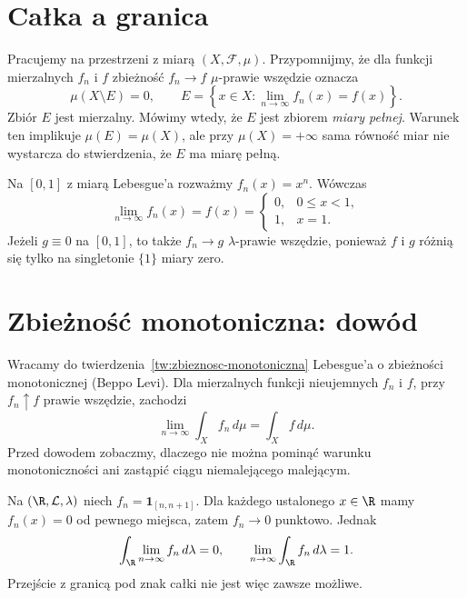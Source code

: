 
\section{Całka a granica}
\label{sec:calka-a-granica}

Pracujemy na przestrzeni z miarą $(X,\mathcal F,\mu)$. Przypomnijmy,
że dla funkcji mierzalnych $f_n$ i $f$ zbieżność $f_n\to f$
$\mu$-prawie wszędzie oznacza
\[
  \mu(X\setminus E)=0,\qquad
  E=\left\{x\in X:\lim_{n\to\infty}f_n(x)=f(x)\right\}.
\]
Zbiór $E$ jest mierzalny. Mówimy wtedy, że $E$ jest zbiorem
\emph{miary pełnej}. Warunek ten implikuje $\mu(E)=\mu(X)$,
ale przy $\mu(X)=+\infty$ sama równość miar nie wystarcza
do stwierdzenia, że $E$ ma miarę pełną.

\begin{przyklad}
\label{prz:potegi-zbieznosc-prawie-wszedzie}
Na $[0,1]$ z miarą Lebesgue'a rozważmy $f_n(x)=x^n$. Wówczas
\[
  \lim_{n\to\infty}f_n(x)=f(x)=
  \begin{cases}
    0,&0\leq x<1,\\
    1,&x=1.
  \end{cases}
\]
Jeżeli $g\equiv0$ na $[0,1]$, to także $f_n\to g$
$\lambda$-prawie wszędzie, ponieważ $f$ i $g$ różnią się tylko
na singletonie $\{1\}$ miary zero.
\end{przyklad}

\section{Zbieżność monotoniczna: dowód}
\label{sec:dowod-zbieznosci-monotonicznej}

Wracamy do twierdzenia~\ref{tw:zbieznosc-monotoniczna}
Lebesgue'a o zbieżności monotonicznej (Beppo Levi). Dla mierzalnych
funkcji nieujemnych $f_n$ i $f$, przy $f_n\uparrow f$ prawie wszędzie,
zachodzi
\[
  \lim_{n\to\infty}\int_X f_n\,d\mu=\int_X f\,d\mu.
\]
Przed dowodem zobaczmy, dlaczego nie można pominąć warunku
monotoniczności ani zastąpić ciągu niemalejącego malejącym.

\begin{przyklad}
\label{prz:przesuwajacy-sie-przedzial}
Na $(\R,\mathcal L,\lambda)$ niech $f_n=\mathbf{1}_{[n,n+1]}$.
Dla każdego ustalonego $x\in\R$ mamy $f_n(x)=0$ od pewnego miejsca,
zatem $f_n\to0$ punktowo. Jednak
\[
  \int_\R\lim_{n\to\infty}f_n\,d\lambda=0,
  \qquad
  \lim_{n\to\infty}\int_\R f_n\,d\lambda=1.
\]
Przejście z granicą pod znak całki nie jest więc zawsze możliwe.
\end{przyklad}

